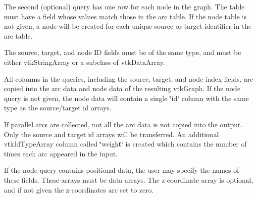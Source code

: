 The second (optional) query has one row for each node in the graph. The table must have a field whose values match those in the arc table. If the node table is not given, a node will be created for each unique source or target identifier in the arc table.

The source, target, and node I\-D fields must be of the same type, and must be either vtk\-String\-Array or a subclass of vtk\-Data\-Array.

All columns in the queries, including the source, target, and node index fields, are copied into the arc data and node data of the resulting vtk\-Graph. If the node query is not given, the node data will contain a single \char`\"{}id\char`\"{} column with the same type as the source/target id arrays.

If parallel arcs are collected, not all the arc data is not copied into the output. Only the source and target id arrays will be transferred. An additional vtk\-Id\-Type\-Array column called \char`\"{}weight\char`\"{} is created which contains the number of times each arc appeared in the input.

If the node query contains positional data, the user may specify the names of these fields. These arrays must be data arrays. The z-\/coordinate array is optional, and if not given the z-\/coordinates are set to zero.

